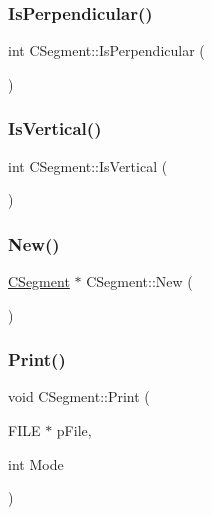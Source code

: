 \mbox{\label{classCSegment_a360ca1950279f25ab238e56e68e004c6}} 
\subsubsection{\texorpdfstring{IsPerpendicular()}{IsPerpendicular()}}
{\footnotesize\ttfamily int C\+Segment\+::\+Is\+Perpendicular (\begin{DoxyParamCaption}{ }\end{DoxyParamCaption})}

\mbox{\label{classCSegment_aa21348278ff23628c2f49d2e5fba125e}} 
\subsubsection{\texorpdfstring{IsVertical()}{IsVertical()}}
{\footnotesize\ttfamily int C\+Segment\+::\+Is\+Vertical (\begin{DoxyParamCaption}{ }\end{DoxyParamCaption})}

\mbox{\label{classCSegment_a0378c7235e713d4bac11d50728b87b6d}} 
\subsubsection{\texorpdfstring{New()}{New()}}
{\footnotesize\ttfamily \mbox{\hyperlink{classCSegment}{C\+Segment}} $\ast$ C\+Segment\+::\+New (\begin{DoxyParamCaption}{ }\end{DoxyParamCaption})\hspace{0.3cm}{\ttfamily [static]}}

\mbox{\label{classCSegment_af1e339a0f89697ab0d851858aab13b89}} 
\subsubsection{\texorpdfstring{Print()}{Print()}}
{\footnotesize\ttfamily void C\+Segment\+::\+Print (\begin{DoxyParamCaption}\item[{F\+I\+LE $\ast$}]{p\+File,  }\item[{int}]{Mode }\end{DoxyParamCaption})\hspace{0.3cm}{\ttfamily [virtual]}}



